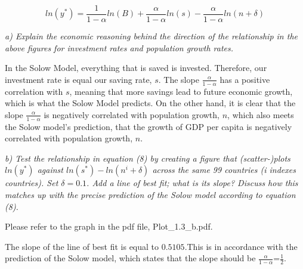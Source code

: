 \documentclass[11pt]{article} %
\begin{document}
\begin{equation}
    ln(y^*)=\frac{1}{1-\alpha}ln(B)+\frac{\alpha}{1-\alpha}ln(s)-\frac{\alpha}{1-\alpha}ln(n+\delta)
\end{equation}

\noindent \textit{a) Explain the economic reasoning behind the direction of the relationship in the above
figures for investment rates and population growth rates.}

In the Solow Model, everything that is saved is invested. Therefore, our investment rate is equal our saving rate, $s$. The slope $\frac{\alpha}{1-\alpha}$ has a positive correlation with $s$, meaning that more savings lead to future economic growth, which is what the Solow Model predicts. On the other hand, it is clear that the slope $\frac{\alpha}{1-\alpha}$ is negatively correlated with population growth, $n$, which also meets the Solow model's prediction, that the growth of GDP per capita is negatively correlated with population growth, $n$. \par

\noindent \textit{b) Test the relationship in equation (8) by creating a figure that (scatter-)plots $ln(y^*)$
against $ln(s^*)-ln(n^i+\delta)$ across the same 99 countries (i indexes countries). Set
$\delta = 0.1$. Add a line of best fit; what is its slope? Discuss how this matches up with the
precise prediction of the Solow model according to equation (8).}

 Please refer to the graph in the pdf file, Plot{_}1.3{_}b.pdf. \par

The slope of the line of best fit is equal to $0.5105$.This is in accordance with the prediction of the Solow model, which states that the slope should be $\frac{\alpha}{1-\alpha}$=$\frac 1 2$. 
\end{document}
